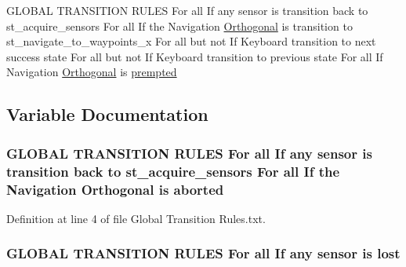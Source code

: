 \begin{DoxyCompactItemize}
\item 
G\+L\+O\+B\+AL T\+R\+A\+N\+S\+I\+T\+I\+ON R\+U\+L\+ES For all If any sensor is transition back to st\+\_\+acquire\+\_\+sensors For all If the Navigation \hyperlink{3_2docs_2Global_01Transition_01Rules_8txt_a2e1cdec29dad5013e514270d0a78fe22}{Orthogonal} is transition to st\+\_\+navigate\+\_\+to\+\_\+waypoints\+\_\+x For all but not If Keyboard transition to next success state For all but not If Keyboard transition to previous state For all If Navigation \hyperlink{3_2docs_2Global_01Transition_01Rules_8txt_a2e1cdec29dad5013e514270d0a78fe22}{Orthogonal} is \hyperlink{docs_2Global_01Transition_01Rules_8txt_ac6583c64beac40f27e253c605d5d5b5b}{prempted}
\end{DoxyCompactItemize}


\subsection{Variable Documentation}
\subsubsection[{\texorpdfstring{aborted}{aborted}}]{\setlength{\rightskip}{0pt plus 5cm}G\+L\+O\+B\+AL T\+R\+A\+N\+S\+I\+T\+I\+ON R\+U\+L\+ES For all If any sensor is transition back to st\+\_\+acquire\+\_\+sensors For all If the Navigation {\bf Orthogonal} is aborted}\hypertarget{docs_2Global_01Transition_01Rules_8txt_a682ac6cc3cf2eeec69ad3f310ae363ea}{}\label{docs_2Global_01Transition_01Rules_8txt_a682ac6cc3cf2eeec69ad3f310ae363ea}


Definition at line 4 of file Global Transition Rules.\+txt.

\subsubsection[{\texorpdfstring{lost}{lost}}]{\setlength{\rightskip}{0pt plus 5cm}G\+L\+O\+B\+AL T\+R\+A\+N\+S\+I\+T\+I\+ON R\+U\+L\+ES For all If any sensor is lost}\hypertarget{docs_2Global_01Transition_01Rules_8txt_a21166d43cc40d1ae31189d3fe91d8346}{}\label{docs_2Global_01Transition_01Rules_8txt_a21166d43cc40d1ae31189d3fe91d8346}


